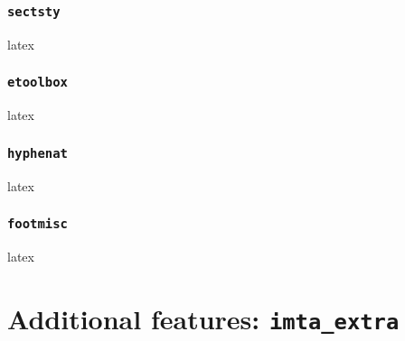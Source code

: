 \documentclass{report}
\begin{document}
\subsection{\texttt{sectsty}}
\begin{imtaCode}{latex}
\RequirePackage{sectsty}
\end{imtaCode}

\subsection{\texttt{etoolbox}}
\begin{imtaCode}{latex}
\RequirePackage{etoolbox}
\end{imtaCode}

\subsection{\texttt{hyphenat}}
\begin{imtaCode}{latex}
\RequirePackage[none]{hyphenat}
\end{imtaCode}

\subsection{\texttt{footmisc}}
\begin{imtaCode}{latex}
\RequirePackage[bottom]{footmisc}
\end{imtaCode}

 \chapter{Additional features: \texttt{imta\_extra}}
\end{document}
